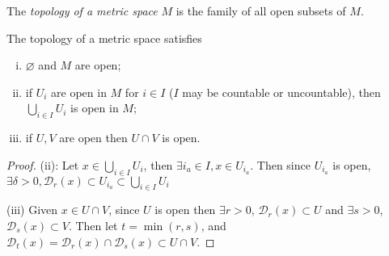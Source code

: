 \begin{definition}
	The \textit{topology of a metric space} \( M \) is the family of all open subsets of \( M \).
\end{definition}
\begin{proposition}
	The topology of a metric space satisfies
	\begin{enumerate}[(i)]
		\item \( \varnothing \) and \( M \) are open;
		\item if \( U_i \) are open in \( M \) for \( i \in I \) (\( I \) may be countable or uncountable), then \( \bigcup_{i \in I} U_i \) is open in \( M \);
		\item if \( U, V \) are open then \( U \cap V \) is open.
	\end{enumerate}
\end{proposition}
\begin{proof}
	(ii): Let \( x \in \bigcup_{i \in I} U_i \), then \( \exists i_a \in I, x \in U_{i_a} \).
	Then since \( U_{i_a} \) is open, \( \exists \delta > 0, \mathcal D_r(x) \subset U_{i_a} \subset \bigcup_{i \in I} U_i \)

	(iii) Given \( x \in U \cap V \), since \( U \) is open then \( \exists r > 0 \), \( \mathcal D_r(x) \subset U \) and \( \exists s > 0 \), \( \mathcal D_s(x) \subset V \).
	Then let \( t = \min(r,s) \), and \( \mathcal D_t(x) = \mathcal D_r(x) \cap \mathcal D_s(x) \subset U \cap V \).
\end{proof}

